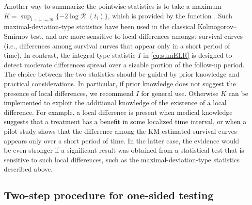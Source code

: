 Another way to summarize the pointwise statistics is to take a maximum
$ %
K=\sup_{i=1,\ldots,m} \{ -2 \log \mathcal{R} $ $(t_i) \}
$, %
which is provided by the function . Such maximal-deviation-type statistics have been used in the classical Kolmogorov--Smirnov test, and are more sensitive to local differences amongst survival curves (i.e., differences among survival curves that appear only in a short period of time). In contrast, the integral-type statistic $I$ in \eqref{eq:sumELR} is designed to detect moderate differences spread over a sizable portion of the follow-up period. %
The choice between the two statistics should be guided by prior knowledge and practical considerations. In particular, if prior knowledge does not suggest the presence of local differences, we recommend $I$ for general use. %
Otherwise $K$ can be implemented to exploit the additional knowledge of the existence of a local difference. For example, a local difference is present when medical knowledge suggests that a treatment has a benefit in some localized time interval, or when a pilot study shows that the difference among the KM estimated survival curves appears only over a short period of time. In the latter case, the evidence would be even stronger if a significant result was obtained from a statistical test that is sensitive to such local differences, such as the maximal-deviation-type statistics described above.



\subsection{Two-step procedure for one-sided testing}\label{sec:pre_test}

